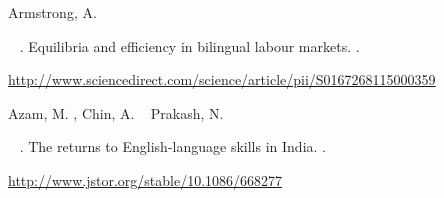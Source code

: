\documentclass[12pt, a4paper]{article}
\begin{document}

\begin{thebibliography}{}

%
\begin{APACrefauthors}%
Armstrong, A.%
\end{APACrefauthors}%
\unskip\
\newblock
{}.
\newblock
{\BBOQ}
  {Equilibria and efficiency in bilingual labour markets}.{\BBCQ}
\newblock
{}.
\newblock
\begin{APACrefURL}
  \url{http://www.sciencedirect.com/science/article/pii/S0167268115000359}
  \end{APACrefURL}
\newblock
\begin{APACrefDOI} 
  \end{APACrefDOI}
\PrintBackRefs{\CurrentBib}

%
\begin{APACrefauthors}%
Azam, M.%
, Chin, A.%
\BCBL {}\ \BBA {} Prakash, N.%
\end{APACrefauthors}%
\unskip\
\newblock
{}.
\newblock
{\BBOQ}
  {The returns to {E}nglish-language skills in {I}ndia}.{\BBCQ}
\newblock
{}.
\newblock
\begin{APACrefURL} \url{http://www.jstor.org/stable/10.1086/668277}
  \end{APACrefURL}
\PrintBackRefs{\CurrentBib}


\end{thebibliography}
\end{document}
